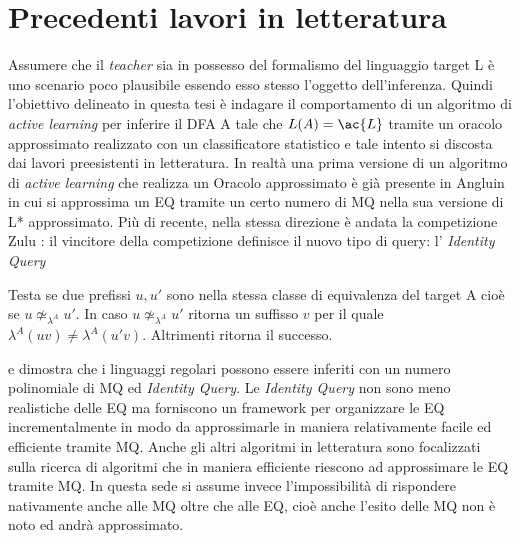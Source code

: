 \section{Precedenti lavori in letteratura}
Assumere che il \textit{teacher} sia in possesso del formalismo del linguaggio target \ac{L} è uno scenario poco plausibile essendo esso stesso l'oggetto dell'inferenza.
Quindi l'obiettivo delineato in questa tesi è indagare il comportamento di un algoritmo di \textit{active learning} per inferire il \ac{DFA} A tale che $L(A) =\ac{L}$ tramite un oracolo approssimato realizzato con un classificatore statistico e tale intento si discosta dai lavori preesistenti in letteratura. In realtà una prima versione di un algoritmo di \textit{active learning} che realizza un Oracolo approssimato è già presente in Angluin \cite{Angluin87} in cui si approssima un \ac{EQ} tramite un certo numero di \ac{MQ} nella sua versione di L* approssimato. Più di recente, nella stessa direzione è andata la competizione Zulu \cite{Zulu10}: il vincitore della competizione \cite{Howar12} definisce il nuovo tipo di query: l'  \textit{Identity Query}
\begin{definizione*} Testa se due prefissi $u,u'$ sono nella stessa classe di equivalenza del target A cioè se $u \not\simeq_{\lambda^{A}} \! u'$. In caso $u \not\simeq_{\lambda^{A}} \! u'$ ritorna un suffisso $v$ per il quale $\lambda^{A}(uv) \neq \lambda^{A}(u'v)$. Altrimenti ritorna il successo. 
\end{definizione*}
e dimostra che i linguaggi regolari possono essere inferiti con un numero polinomiale di \ac{MQ} ed \textit{Identity Query}.       
Le \textit{Identity Query} non sono meno realistiche delle \ac{EQ} ma forniscono un framework per organizzare le \ac{EQ} incrementalmente in modo da approssimarle in maniera relativamente facile ed efficiente tramite \ac{MQ}.  Anche gli altri algoritmi in letteratura sono focalizzati sulla ricerca di algoritmi che in maniera efficiente riescono ad approssimare le \ac{EQ} tramite \ac{MQ}.  In questa sede si assume invece l'impossibilità di rispondere nativamente anche alle \ac{MQ} oltre che alle \ac{EQ}, cioè  anche l'esito delle \ac{MQ} non è noto ed andrà approssimato.

